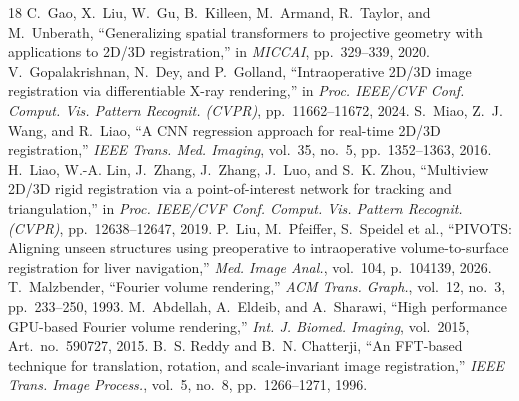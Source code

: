 \documentclass[review,12pt]{elsarticle}
\begin{document}
\begin{thebibliography}{18}
C.~Gao, X.~Liu, W.~Gu, B.~Killeen, M.~Armand, R.~Taylor, and M.~Unberath, ``Generalizing spatial transformers to projective geometry with applications to 2D/3D registration,'' in \emph{MICCAI}, pp.~329--339, 2020.
V.~Gopalakrishnan, N.~Dey, and P.~Golland, ``Intraoperative 2D/3D image registration via differentiable X-ray rendering,'' in \emph{Proc. IEEE/CVF Conf. Comput. Vis. Pattern Recognit. (CVPR)}, pp.~11662--11672, 2024.
S.~Miao, Z.~J. Wang, and R.~Liao, ``A CNN regression approach for real-time 2D/3D registration,'' \emph{IEEE Trans. Med. Imaging}, vol.~35, no.~5, pp.~1352--1363, 2016.
H.~Liao, W.-A. Lin, J.~Zhang, J.~Zhang, J.~Luo, and S.~K. Zhou, ``Multiview 2D/3D rigid registration via a point-of-interest network for tracking and triangulation,'' in \emph{Proc. IEEE/CVF Conf. Comput. Vis. Pattern Recognit. (CVPR)}, pp.~12638--12647, 2019.
P.~Liu, M.~Pfeiffer, S.~Speidel et al., ``PIVOTS: Aligning unseen structures using preoperative to intraoperative volume-to-surface registration for liver navigation,'' \emph{Med. Image Anal.}, vol.~104, p.~104139, 2026.
T.~Malzbender, ``Fourier volume rendering,'' \emph{ACM Trans. Graph.}, vol.~12, no.~3, pp.~233--250, 1993.
M.~Abdellah, A.~Eldeib, and A.~Sharawi, ``High performance GPU-based Fourier volume rendering,'' \emph{Int. J. Biomed. Imaging}, vol.~2015, Art.~no.~590727, 2015.
B.~S. Reddy and B.~N. Chatterji, ``An FFT-based technique for translation, rotation, and scale-invariant image registration,'' \emph{IEEE Trans. Image Process.}, vol.~5, no.~8, pp.~1266--1271, 1996.
\end{thebibliography}
\end{document}
